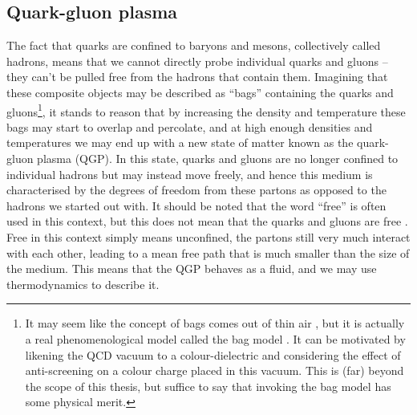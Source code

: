   \subsection{Quark-gluon plasma}
  \label{sec:qgp}
    The fact that quarks are confined to baryons and mesons, collectively called hadrons, means that we cannot directly probe individual  quarks and gluons -- they can't be pulled free from the hadrons that contain them. Imagining that these composite objects may be described as ``bags'' containing the quarks and gluons\footnote{It may seem like the concept of bags comes out of thin air , but it is actually a real phenomenological model called the bag model \cite{BagModel}. It can be motivated by likening the QCD vacuum to a colour-dielectric and considering the effect of anti-screening on a colour charge placed in this vacuum. This is (far) beyond the scope of this thesis, but suffice to say that invoking the bag model has some physical merit.}, it stands to reason that by increasing the density and temperature these bags may start to overlap and percolate, and at high enough densities and temperatures we may end up with a new state of matter known as the quark-gluon plasma (QGP).  In this state, quarks and gluons are no longer confined to individual hadrons but may instead move freely, and hence this medium is characterised by the degrees of freedom from these partons as opposed to the hadrons we started out with. It should be noted that the word ``free'' is often used in this context, but this does not  mean that the quarks and gluons are free .   Free in this context simply means unconfined, the partons still very much interact with each other, leading to a mean free path that is much smaller than the size of the medium. This means that the QGP behaves as a fluid, and we may use thermodynamics to describe it. 

